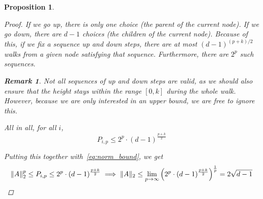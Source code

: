 \documentclass{amsart}
\theoremstyle{plain}
\newtheorem*{proposition}{\textbf{Proposition}}
\theoremstyle{definition}
\newtheorem*{rk}{\textbf{Remark}}
\DeclarePairedDelimiter{\norm}{\lVert}{\rVert}
\begin{document}
\begin{proposition}
\begin{proof}
            If we go \emph{up}, there is only one choice (the parent of the current node).
            If we go \emph{down}, there are $d-1$ choices (the children of the current node).
            Because of this, if we fix a sequence \emph{up} and \emph{down} steps, there are at most
            $(d-1)^{(p+k) / 2}$ walks from a given node satisfying that sequence.
            Furthermore, there are $2^p$ such sequences.
            \begin{rk}
                Not all sequences of \emph{up} and \emph{down} steps
                are valid, as we should also ensure that the
                height stays within the range $[0, k]$ during the whole walk.
                However, because we are only interested in an upper bound,
                we are free to ignore this.
            \end{rk}

            All in all, for all $i$,
            \begin{equation*}
                P_{i,p} \leq
                2^p \cdot (d-1)^{\frac{p+k}{2}}
            \end{equation*}

            Putting this together with~\eqref{eq:norm_bound}, we get
            \begin{equation*}
                \norm{A}_2^p \leq
                P_{i, p} \leq
                2^p \cdot (d-1)^{\frac{p+k}{2}} \implies
                \norm{A}_2 \leq \lim_{p \to \infty}
                \left(2^p \cdot (d-1)^{\frac{p+k}{2}}\right)^{\frac{1}{p}} = 2 \sqrt{d-1}
            \end{equation*}
        \end{proof}
    \end{proposition}
\end{document}
